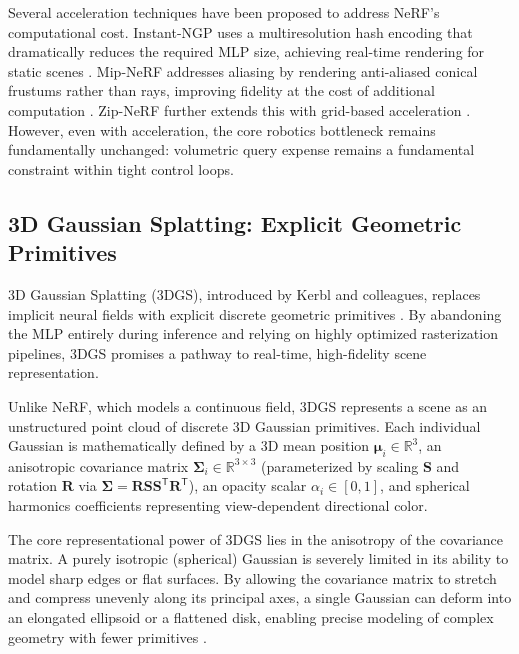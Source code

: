 \documentclass[12pt,a4paper,oneside]{report}
\begin{document}
Several acceleration techniques have been proposed to address NeRF's computational cost. Instant-NGP uses a multiresolution hash encoding that dramatically reduces the required MLP size, achieving real-time rendering for static scenes \cite{muller2022instant}. Mip-NeRF addresses aliasing by rendering anti-aliased conical frustums rather than rays, improving fidelity at the cost of additional computation \cite{barron2021mip}. Zip-NeRF further extends this with grid-based acceleration \cite{barron2023zipnerf}. However, even with acceleration, the core robotics bottleneck remains fundamentally unchanged: volumetric query expense remains a fundamental constraint within tight control loops.

\subsection{3D Gaussian Splatting: Explicit Geometric Primitives}
\label{subsec:3d_gaussian_splatting_explicit_geometric_primitives}

3D Gaussian Splatting (3DGS), introduced by Kerbl and colleagues, replaces implicit neural fields with explicit discrete geometric primitives \cite{kerbl20233d}. By abandoning the MLP entirely during inference and relying on highly optimized rasterization pipelines, 3DGS promises a pathway to real-time, high-fidelity scene representation.

Unlike NeRF, which models a continuous field, 3DGS represents a scene as an unstructured point cloud of discrete 3D Gaussian primitives. Each individual Gaussian is mathematically defined by a 3D mean position $\boldsymbol{\mu}_i \in \mathbb{R}^3$, an anisotropic covariance matrix $\boldsymbol{\Sigma}_i \in \mathbb{R}^{3 \times 3}$ (parameterized by scaling $\mathbf{S}$ and rotation $\mathbf{R}$ via $\boldsymbol{\Sigma} = \mathbf{R} \mathbf{S} \mathbf{S}^\mathsf{T} \mathbf{R}^\mathsf{T}$), an opacity scalar $\alpha_i \in [0, 1]$, and spherical harmonics coefficients representing view-dependent directional color.

The core representational power of 3DGS lies in the anisotropy of the covariance matrix. A purely isotropic (spherical) Gaussian is severely limited in its ability to model sharp edges or flat surfaces. By allowing the covariance matrix to stretch and compress unevenly along its principal axes, a single Gaussian can deform into an elongated ellipsoid or a flattened disk, enabling precise modeling of complex geometry with fewer primitives \cite{kerbl20233d}.
\end{document}

